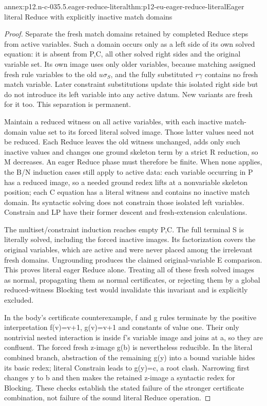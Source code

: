 \begin{annexitem}{annex:p12.n-c-035.5.eager-reduce-literal}{thm:p12-eu-eager-reduce-literal}{Eager literal Reduce with explicitly inactive match domains}
\begin{proof}
Separate the fresh match domains retained by completed Reduce steps
from active variables. Such a domain occurs only as a left side of
its own solved equation: it is absent from P,C, all other solved
right sides and the original variable set. Its own image uses only
older variables, because matching assigned fresh rule variables to
the old \(u\sigma_S\), and the fully substituted \(r\gamma\)
contains no fresh match variable. Later constraint substitutions
update this isolated right side but do not introduce its left
variable into any active datum. New variants are fresh for it too.
This separation is permanent.

Maintain a reduced witness on all active variables, with each
inactive match-domain value set to its forced literal solved image.
Those latter values need not be reduced. Each Reduce leaves the
old witness unchanged, adds only such inactive values and changes
one ground skeleton term by a strict R reduction, so M decreases.
An eager Reduce phase must therefore be finite. When none applies,
the B/N induction cases still apply to active data: each variable
occurring in P has a reduced image, so a needed ground redex lifts
at a nonvariable skeleton position; each C equation has a literal
witness and contains no inactive match domain. Its syntactic solving
does not constrain those isolated left variables. Constrain and LP
have their former descent and fresh-extension calculations.

The multiset/constraint induction reaches empty P,C. The full
terminal S is literally solved, including the forced inactive
images. Its factorization covers the original variables, which
are active and were never placed among the irrelevant fresh
domains. Ungrounding produces the claimed original-variable E
comparison. This proves literal eager Reduce alone. Treating all
of these fresh solved images as normal, propagating them as normal
certificates, or rejecting them by a global reduced-witness Blocking
test would invalidate this invariant and is explicitly excluded.

In the body's certificate counterexample, f and g rules terminate
by the positive interpretation f(v)=v+1, g(v)=v+1 and constants
of value one. Their only nontrivial nested interaction is inside
f's variable image and joins at a, so they are confluent.
The forced fresh z-image g(b) is nevertheless reducible. In the
literal combined branch, abstraction of the remaining g(y) into
a bound variable hides its basic redex; literal Constrain leads
to g(y)=c, a root clash. Narrowing first changes y to b and then
makes the retained z-image a syntactic redex for Blocking. These
checks establish the stated failure of the stronger certificate
combination, not failure of the sound literal Reduce operation.
\end{proof}
\end{annexitem}

